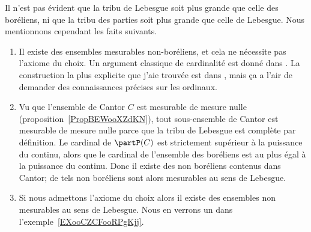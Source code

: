 \begin{remark}
    Il n'est pas évident que la tribu de Lebesgue soit plus grande que celle des boréliens, ni que la tribu des parties soit plus grande que celle de Lebesgue. Nous mentionnons cependant les faits suivants.
    \begin{enumerate}
        \item
            Il existe des ensembles mesurables non-boréliens, et cela ne nécessite pas l'axiome du choix. Un argument classique de cardinalité est donné dans \cite{SFYoobgQUp}. La construction la plus explicite que j'aie trouvée est dans \cite{XSHoosgoQa}, mais ça a l'air de demander des connaissances précises sur les ordinaux.
        \item
            Vu que l'ensemble de Cantor \( C\) est mesurable de mesure nulle (proposition~\ref{PropBEWooXZdKN}), tout sous-ensemble de Cantor est mesurable de mesure nulle parce que la tribu de Lebesgue est complète par définition. Le cardinal de \( \partP(C)\) est strictement supérieur à la puissance du continu, alors que le cardinal de l'ensemble des boréliens est au plus égal à la puissance du continu. Donc il existe des non boréliens contenus dans Cantor; de tels non boréliens sont alors mesurables au sens de Lebesgue.

        \item
            Si nous admettons l'axiome du choix alors il existe des ensembles non mesurables au sens de Lebesgue. Nous en verrons un dans l'exemple~\ref{EXooCZCFooRPgKjj}.
    \end{enumerate}
\end{remark}

